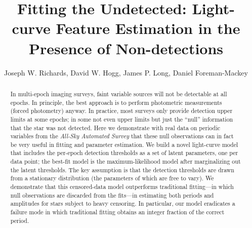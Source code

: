 \documentclass[12pt,preprint]{aastex}
\begin{document}

\title{Fitting the Undetected:  Light-curve Feature Estimation in the Presence of Non-detections}
\author{
Joseph W. Richards,
David W. Hogg,
James P. Long,
Daniel Foreman-Mackey
}
%


\begin{abstract}
In multi-epoch imaging surveys, faint variable sources will not be
detectable at all epochs.  In principle, the best approach is to
perform photometric measurements (forced photometry) anyway.
%
In practice, most surveys only provide detection upper limits at some
epochs; in some not even upper limits but just the ``null''
information that the star was not detected.
%
Here we demonstrate with real data on periodic variables from the
\textsl{All-Sky Automated Survey} that these null observations can
in fact be very useful in fitting and parameter estimation.
%
We build a novel light-curve model that includes the per-epoch
detection thresholds as a set of latent parameters, one per data
point; the best-fit model is the maximum-likelihood model after
marginalizing out the latent thresholds.
%
The key assumption is that the detection thresholds are drawn from a
stationary distribution (the parameters of which are free to vary).
%
We demonstrate that this censored-data model outperforms traditional
fitting---in which null observations are discarded from the
fits---in estimating both periods and amplitudes for stars subject to
heavy censoring.
%
In particular, our model eradicates a failure mode in which
traditional fitting obtains an integer fraction of the correct period.
\end{abstract}
\end{document}
